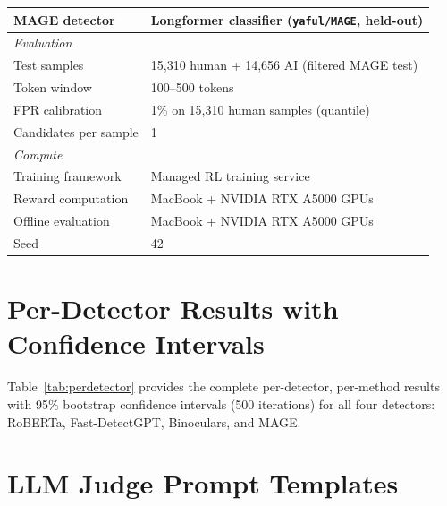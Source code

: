 \documentclass[11pt]{article}
\begin{document}
\begin{center}
{\begin{tabular}{ll}
MAGE detector & Longformer classifier (\texttt{yaful/MAGE}, held-out) \\
\midrule
\multicolumn{2}{l}{\textit{Evaluation}} \\
Test samples & 15,310 human + 14,656 AI (filtered MAGE test) \\
Token window & 100--500 tokens \\
FPR calibration & 1\% on 15,310 human samples (quantile) \\
Candidates per sample & 1 \\
\midrule
\multicolumn{2}{l}{\textit{Compute}} \\
Training framework & Managed RL training service \\
Reward computation & MacBook + NVIDIA RTX A5000 GPUs \\
Offline evaluation & MacBook + NVIDIA RTX A5000 GPUs \\
Seed & 42 \\
\bottomrule
\end{tabular}
}
\label{tab:hyperparams}
\end{center}

\FloatBarrier
\section{Per-Detector Results with Confidence Intervals}
\label{app:perdetector}

Table~\ref{tab:perdetector} provides the complete per-detector, per-method results with 95\% bootstrap confidence intervals (500 iterations) for all four detectors: RoBERTa, Fast-DetectGPT, Binoculars, and MAGE.

\begin{table}[t]
\centering
\footnotesize
\setlength{\tabcolsep}{3pt}
\resizebox{\columnwidth}{!}{%
  
}
\caption{Complete per-detector results with 95\% bootstrap confidence intervals for all four detectors: RoBERTa, Fast-DetectGPT, Binoculars, and MAGE. Bold indicates the best value per metric. StealthRL (M2) achieves near-zero TPR@1\%FPR on three of the four detectors.}
\label{tab:perdetector}
\end{table}

\FloatBarrier
\section{LLM Judge Prompt Templates}
\label{app:prompts}
\end{document}
